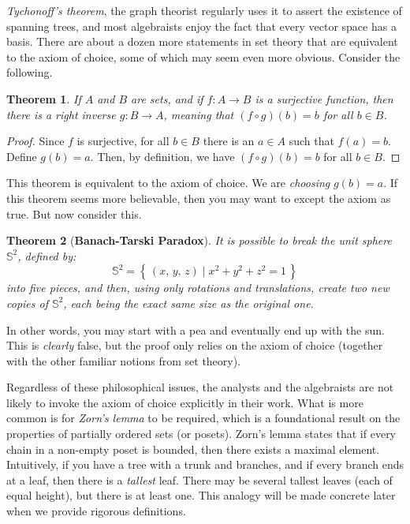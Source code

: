 \documentclass{article}
\newtheorem{theorem}{Theorem}[section]
\theoremstyle{definition}
\begin{document}
        \textit{Tychonoff's theorem}, the graph theorist regularly
        uses it to assert the existence of spanning trees, and most algebraists
        enjoy the fact that every vector space has a basis. There are about
        a dozen more statements in set theory that are equivalent to the
        axiom of choice, some of which may seem even more obvious. Consider
        the following.
        \begin{theorem}
            If $A$ and $B$ are sets, and if $f:A\rightarrow{B}$ is a
            surjective function, then there is a \textit{right inverse}
            $g:B\rightarrow{A}$, meaning that $(f\circ{g})(b)=b$ for all
            $b\in{B}$.
        \end{theorem}
        \begin{proof}
            Since $f$ is surjective, for all $b\in{B}$ there is an $a\in{A}$
            such that $f(a)=b$. Define $g(b)=a$. Then, by definition, we have
            $(f\circ{g})(b)=b$ for all $b\in{B}$.
        \end{proof}
        This theorem is equivalent to the axiom of choice. We are
        \textit{choosing} $g(b)=a$. If this theorem seems more believable,
        then you may want to except the axiom as true. But now consider this.
        \begin{theorem}[\textbf{Banach-Tarski Paradox}]
            It is possible to break the unit sphere $\mathbb{S}^{2}$,
            defined by:
            \begin{equation}
                \mathbb{S}^{2}
                =\left\{\,(x,\,y,\,z)\;\big|\;x^{2}+y^{2}+z^{2}=1\,\right\}
            \end{equation}
            into five pieces, and then, using only rotations and translations,
            create two new copies of $\mathbb{S}^{2}$, each being the exact
            same size as the original one.
        \end{theorem}
        In other words, you may start with a pea and eventually end up with
        the sun. This is \textit{clearly} false, but the proof only relies on
        the axiom of choice (together with the other familiar notions from
        set theory).
        \par\hfill\par
        Regardless of these philosophical issues, the analysts and the
        algebraists are not likely to invoke the axiom of choice explicitly
        in their work. What is more common is for \textit{Zorn's lemma} to
        be required, which is a foundational result on the properties of
        partially ordered sets (or posets). Zorn's lemma states that if every
        chain in a non-empty poset is bounded,
        then there exists a maximal element.
        Intuitively, if you have a tree with a trunk and branches, and if
        every branch ends at a leaf, then there is a \textit{tallest} leaf.
        There may be several tallest leaves (each of equal height), but there
        is at least one. This analogy will be made concrete later when we
        provide rigorous definitions.
\end{document}
